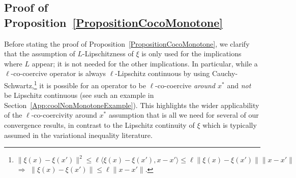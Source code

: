 \documentclass{article}
\begin{document}
\subsection{Proof of Proposition~\ref{PropositionCocoMonotone}}

Before stating the proof of Proposition~\ref{PropositionCocoMonotone}, we clarify that the assumption of $L$-Lipschitzness of $\xi$ is only used for the implications where $L$ appear; it is not needed for the other implications. In particular, while a $\ell$-co-coercive operator is always $\ell$-Lipschitz continuous by using Cauchy-Schwartz,\footnote{$\| \xi(x) - \xi(x')\|^2 \leq \ell \langle \xi(x)-\xi(x'), x-x' \rangle \leq \ell  \| \xi(x)-\xi(x') \| \|  x-x' \|$ $\Longrightarrow$  $\| \xi(x) - \xi(x')\| \leq \ell \|  x-x' \|$.} it is possible for an operator to be $\ell$-co-coercive \emph{around $x^*$} and \emph{not} be Lipschitz continuous (see such an example in Section~\ref{App:coolNonMonotoneExample}). This highlights the wider applicability of the $\ell$-co-coercivity around $x^*$ assumption that is all we need for several of our convergence results, in contrast to the Lipschitz continuity of $\xi$ which is typically assumed in the variational inequality literature. 
\end{document}
